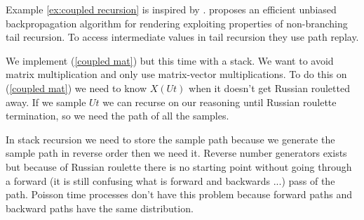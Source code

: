 \documentclass[a4paper,12pt]{article}
\begin{document}
\begin{related}
    Example \ref{ex:coupled recursion} is inspired by \cite{vicini_path_2021}.
    \cite{vicini_path_2021} proposes an efficient unbiased backpropagation
    algorithm for rendering exploiting properties of non-branching tail recursion.
    To access intermediate values in tail recursion they use path replay.
\end{related}


\begin{julia} \label{jl:stack recursion couple}
    We implement (\ref{coupled mat}) but this time with a stack.
    We want to avoid matrix multiplication and only use matrix-vector multiplications.
    To do this on (\ref{coupled mat}) we need to know $X(Ut)$ when
    it doesn't get Russian rouletted away. If we sample $Ut$ we can recurse
    on our reasoning until Russian roulette termination, so we need the path
    of all the samples.
    \vspace{0.3cm}
\end{julia}

In stack recursion we need to store the sample path because we generate the
sample path in reverse order then we need it. Reverse number generators exists
but because of Russian roulette there is no starting point without going through
a forward (it is still confusing what is forward and backwards ...) pass of the path.
Poisson time processes don't have this problem because forward paths and backward paths
have the same distribution.
\end{document}
